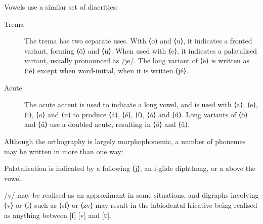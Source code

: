 \documentclass[grammar]{subfiles}
\begin{document}
  \pagebreak[2]
  Vowels use a similar set of diacritics:

  \begin{description}
    \item[Trema] The trema has two separate uses.  With ⟨o⟩ and ⟨u⟩, it indicates a fronted variant, forming ⟨ö⟩ and ⟨ü⟩.  When used with ⟨e⟩, it indicates a palatalised variant, usually pronounced as /je/.  The long variant of ⟨ë⟩ is written as ⟨ié⟩ except when word-initial, when it is written ⟨jé⟩. 


    \item[Acute] The acute accent is used to indicate a long vowel, and is used with ⟨a⟩, ⟨e⟩, ⟨i⟩, ⟨o⟩ and ⟨u⟩ to produce ⟨á⟩, ⟨é⟩, ⟨í⟩, ⟨ó⟩ and ⟨ú⟩.  Long variants of ⟨ö⟩ and ⟨ü⟩ use a doubled acute, resulting in ⟨ő⟩ and ⟨ű⟩. 
  \end{description}

  Although the orthography is largely morphophonemic, a number of phonemes may be written in more than one way:

  \begin{itemize*}
    \item Palatalisation is indicated by a following ⟨j⟩, an i-glide diphthong, or a  above the vowel.  %
    \item /v/ may be realised as an approximant in some situations, and digraphs involving ⟨v⟩ or ⟨f⟩ such as ⟨sf⟩ or ⟨zv⟩ may result in the labiodental fricative being realised as anything between [f] [v] and [ʋ].
  \end{itemize*}
\end{document}
